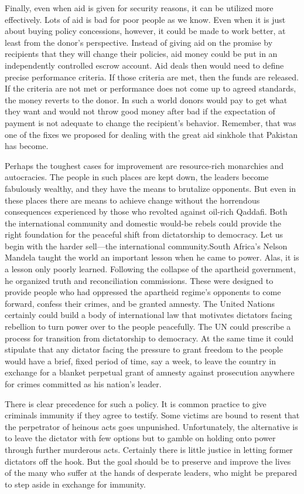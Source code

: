 \documentclass[10pt]{article}
\begin{document}
{\large Finally, even when aid is given for security reasons, it can be utilized
more effectively. Lots of aid is bad for poor people as we know. Even when it is
just about buying policy concessions, however, it could be made to work better,
at least from the donor's perspective. Instead of giving aid on the promise by
recipients that they will change their policies, aid money could be put in an
independently controlled escrow account. Aid deals then would need to define
precise performance criteria. If those criteria are met, then the funds are
released. If the criteria are not met or performance does not come up to agreed
standards, the money reverts to the donor. In such a world donors would pay to
get what they want and would not throw good money after bad if the expectation of
payment is not adequate to change the recipient's behavior. Remember, that was
one of the fixes we proposed for dealing with the great aid sinkhole that
Pakistan has become.}

{\large Perhaps the toughest cases for improvement are resource-rich monarchies
and autocracies. The people in such places are kept down, the leaders become
fabulously wealthy, and they have the means to brutalize opponents. But even in
these places there are means to achieve change without the horrendous
consequences experienced by those who revolted against oil-rich Qaddafi. Both the
international community and domestic would-be rebels could provide the right
foundation for the peaceful shift from dictatorship to democracy. Let us begin
with the harder sell---the international community.South Africa's Nelson Mandela
taught the world an important lesson when he came to power. Alas, it is a lesson
only poorly learned. Following the collapse of the apartheid government, he
organized truth and reconciliation commissions. These were designed to provide
people who had oppressed the apartheid regime's opponents to come forward,
confess their crimes, and be granted amnesty. The United Nations certainly could
build a body of international law that motivates dictators facing rebellion to
turn power over to the people peacefully. The UN could prescribe a process for
transition from dictatorship to democracy. At the same time it could stipulate
that any dictator facing the pressure to grant freedom to the people would have a
brief, fixed period of time, say a week, to leave the country in exchange for a
blanket perpetual grant of amnesty against prosecution anywhere for crimes
committed as his nation's leader.}

{\large There is clear precedence for such a policy. It is common practice to
give criminals immunity if they agree to testify. Some victims are bound to
resent that the perpetrator of heinous acts goes unpunished. Unfortunately, the
alternative is to leave the dictator with few options but to gamble on holding
onto power through further murderous acts. Certainly there is little justice in
letting former dictators off the hook. But the goal should be to preserve and
improve the lives of the many who suffer at the hands of desperate leaders, who
might be prepared to step aside in exchange for immunity.}
\end{document}
